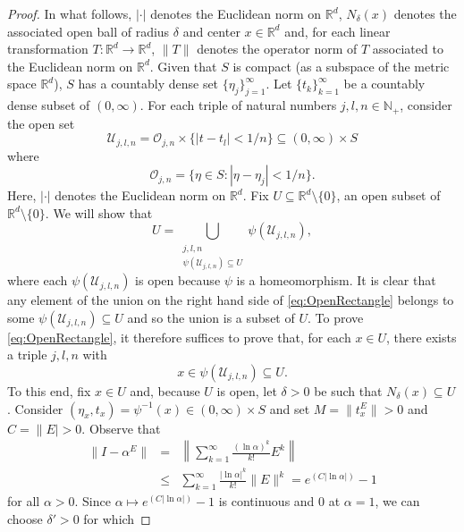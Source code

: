 \documentclass[11pt]{article}
\theoremstyle{theorem}
\begin{document}
\begin{proof}
In what follows, $|\cdot|$ denotes the Euclidean norm on $\mathbb{R}^d$, $N_\delta(x)$ denotes the associated open ball of radius $\delta$ and center $x\in\mathbb{R}^d$ and, for each linear transformation $T:\mathbb{R}^d\to\mathbb{R}^d$, $\|T\|$ denotes the operator norm of $T$ associated to the Euclidean norm on $\mathbb{R}^d$. Given that $S$ is compact (as a subspace of the metric space $\mathbb{R}^d$), $S$ has a countably dense set $\{\eta_j\}_{j=1}^\infty$. Let $\{t_k\}_{k=1}^\infty$ be a countably dense subset of $(0,\infty)$. For each triple of natural numbers $j,l,n\in\mathbb{N}_+$, consider the open set
\begin{equation*}
\mathcal{U}_{j,l,n}=\mathcal{O}_{j,n}\times \{ \vert t - t_l \vert < 1/n \}\subseteq (0,\infty)\times S
\end{equation*}
where
\begin{equation*}
\mathcal{O}_{j,n}=\{\eta\in S: |\eta-\eta_j|<1/n\}.
\end{equation*}
Here, $|\cdot|$ denotes the Euclidean norm on $\mathbb{R}^d$. Fix $U\subseteq \mathbb{R}^d\setminus \{0\}$, an open subset of $\mathbb{R}^d\setminus\{0\}$. We will show that
\begin{equation}\label{eq:OpenRectangle}
U=\bigcup_{\substack{j,l,n\\ \psi(\mathcal{U}_{j,l,n})\subseteq U}}\psi(\mathcal{U}_{j,l,n}),
\end{equation}
where each $\psi(\mathcal{U}_{j,l,n})$ is open because $\psi$ is a homeomorphism. It is clear that any element of the union on the right hand side of \eqref{eq:OpenRectangle} belongs to some $\psi(\mathcal{U}_{j,l,n}) \subseteq U$ and so the union is a subset of $U$. To prove \eqref{eq:OpenRectangle}, it therefore suffices to prove that, for each $x\in U$, there exists a triple $j,l,n$ with
\begin{equation*}
x\in\psi(\mathcal{U}_{j,l,n})\subseteq U.
\end{equation*}
To this end, fix $x\in U$ and, because $U$ is open, let $\delta>0$ be such that $N_{\delta}(x)\subseteq U$. Consider $(\eta_x,t_x)=\psi^{-1}(x)\in (0,\infty)\times S$ and set $M=\|t_x^E\|>0$ and $C=\|E|>0$. Observe that 
\begin{eqnarray*}
\|I-\alpha^E\|&=&\left\|\sum_{k=1}^\infty \frac{(\ln \alpha)^k}{k!} E^k\right\|\\
&\leq &\sum_{k=1}^\infty \frac{|\ln \alpha|^k}{k!} \|E\|^k=e^{(C|\ln \alpha|)}-1
\end{eqnarray*}
for all $\alpha>0$. Since $\alpha\mapsto e^{(C|\ln \alpha|)}-1$ is continuous and $0$ at $\alpha=1$, we can choose $\delta'>0$ for which

\end{proof}
\end{document}
